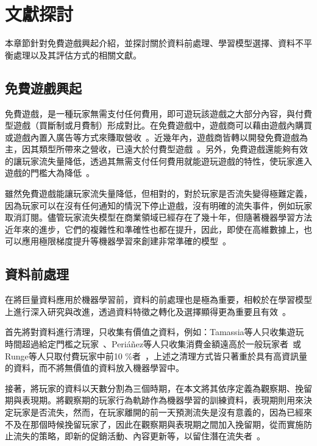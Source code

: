 \chapter{文獻探討}
\label{cha:RelatedWork}

本章節針對免費遊戲興起介紹，並探討關於資料前處理、學習模型選擇、資料不平衡處理以及其評估方式的相關文獻。

\section{免費遊戲興起}

免費遊戲，是一種玩家無需支付任何費用，即可遊玩該遊戲之大部分內容，與付費型遊戲（買斷制或月費制）形成對比。在免費遊戲中，遊戲商可以藉由遊戲內購買或遊戲內置入廣告等方式來賺取營收~\cite{wiki:f2p}。近幾年內，遊戲商皆轉以開發免費遊戲為主，因其類型所帶來之營收，已遠大於付費型遊戲~\cite{lee2018game}。另外，免費遊戲還能夠有效的讓玩家流失量降低，透過其無需支付任何費用就能遊玩遊戲的特性，使玩家進入遊戲的門檻大為降低~\cite{10.1007/978-3-030-27355-2_10}。

雖然免費遊戲能讓玩家流失量降低，但相對的，對於玩家是否流失變得極難定義，因為玩家可以在沒有任何通知的情況下停止遊戲，沒有明確的流失事件，例如玩家取消訂閱。儘管玩家流失模型在商業領域已經存在了幾十年，但隨著機器學習方法近年來的進步，它們的複雜性和準確性也都在提升，因此，即使在高維數據上，也可以應用極限梯度提升等機器學習來創建非常準確的模型~\cite{XGBoostTemporalData}。

\section{資料前處理}

在將巨量資料應用於機器學習前，資料的前處理也是極為重要，相較於在學習模型上進行深入研究與改進，透過資料特徵之轉化及選擇顯得更為重要且有效~\cite{lee2018game}。

首先將對資料進行清理，只收集有價值之資料，例如：Tamassia等人只收集遊玩時間超過給定門檻之玩家~\cite{tamassia2016predicting}、Periáñez等人只收集消費金額遠高於一般玩家者~\cite{perianez2016churn}或Runge等人只取付費玩家中前10 \%者~\cite{runge2014churn}，上述之清理方式皆只著重於具有高資訊量的資料，而不將無價值的資料放入機器學習中。

接著，將玩家的資料以天數分割為三個時期，在本文將其依序定義為觀察期、挽留期與表現期。將觀察期的玩家行為軌跡作為機器學習的訓練資料，表現期則用來決定玩家是否流失，然而，在玩家離開的前一天預測流失是沒有意義的，因為已經來不及在那個時候挽留玩家了，因此在觀察期與表現期之間加入挽留期，從而實施防止流失的策略，即新的促銷活動、內容更新等，以留住潛在流失者~\cite{lee2018game}。

